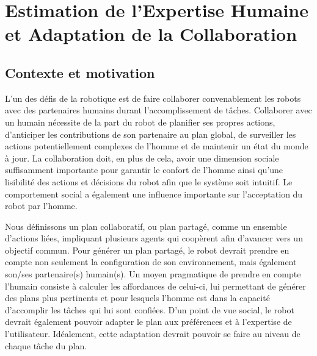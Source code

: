 \documentclass[a4paper,11pt,twoside]{StyleThese}
\begin{document}
\setcounter{chapter}{5} %
\dominitoc
\faketableofcontents
\fi

\chapter{Estimation de l'Expertise Humaine et Adaptation de la Collaboration}
\label{chapter5}
\minitoc

\section{Contexte et motivation}
L'un des défis de la robotique est de faire collaborer convenablement les robots avec des partenaires humains durant l'accomplissement de tâches. Collaborer avec un humain nécessite de la part du robot de planifier ses propres actions, d'anticiper les contributions de son partenaire au plan global, de surveiller les actions potentiellement complexes de l'homme et de maintenir un état du monde à jour. La collaboration doit, en plus de cela, avoir une dimension sociale suffisamment importante pour garantir le confort de l'homme ainsi qu'une lisibilité des actions et décisions du robot afin que le système soit intuitif. Le comportement social a également une influence importante sur l'acceptation du robot par l'homme.

Nous définissons un plan collaboratif, ou plan partagé, comme un ensemble d'actions liées, impliquant plusieurs agents qui coopèrent afin d'avancer vers un objectif commun.
Pour générer un plan partagé, le robot devrait prendre en compte non seulement la configuration de son environnement, mais également son/ses partenaire(s) humain(s). Un moyen pragmatique de prendre en compte l'humain consiste à calculer les affordances de celui-ci, lui permettant de générer des plans plus pertinents et pour lesquels l'homme est dans la capacité d'accomplir les tâches qui lui sont confiées. D'un point de vue social, le robot devrait également pouvoir adapter le plan aux préférences et à l'expertise de l'utilisateur. Idéalement, cette adaptation devrait pouvoir se faire au niveau de chaque tâche du plan.
\end{document}
